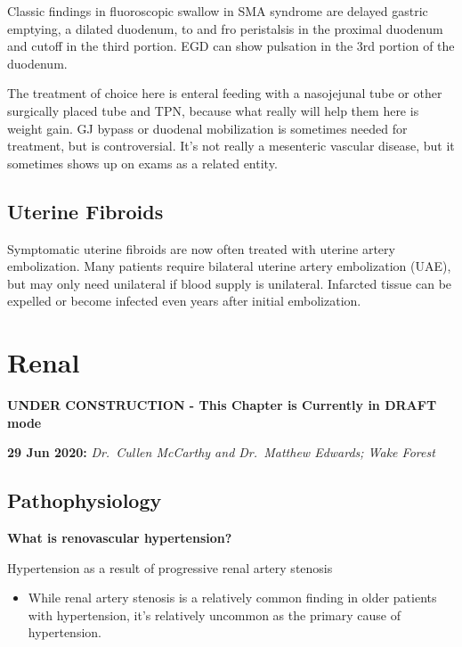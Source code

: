 \documentclass[
]{book}
\providecommand{\tightlist}{%
  \setlength{\itemsep}{0pt}\setlength{\parskip}{0pt}}
\begin{document}
Classic findings in fluoroscopic swallow in SMA syndrome are delayed
gastric emptying, a dilated duodenum, to and fro peristalsis in the
proximal duodenum and cutoff in the third portion. EGD can show
pulsation in the 3rd portion of the
duodenum.\citep{warnckeSuperiorMesentericArtery2019}

The treatment of choice here is enteral feeding with a nasojejunal tube
or other surgically placed tube and TPN, because what really will help
them here is weight gain. GJ bypass or duodenal mobilization is
sometimes needed for treatment, but is controversial. It's not really a
mesenteric vascular disease, but it sometimes shows up on exams as a
related entity.\citep{welschRecallingSuperiorMesenteric2007, merrettSuperiorMesentericArtery2009}

\hypertarget{uterine-fibroids}{%
\section{Uterine Fibroids}\label{uterine-fibroids}}

Symptomatic uterine fibroids are now often treated with uterine artery
embolization. Many patients require bilateral uterine artery
embolization (UAE), but may only need unilateral if blood supply is
unilateral. Infarcted tissue can be expelled or become infected even
years after initial embolization.
\citep{stepniakUterineArteryEmbolization2018}

\hypertarget{renal}{%
\chapter{Renal}\label{renal}}

\textbf{UNDER CONSTRUCTION - This Chapter is Currently in DRAFT mode}

\textbf{29 Jun 2020:} \emph{Dr.~Cullen McCarthy and Dr.~Matthew Edwards; Wake
Forest}

\hypertarget{pathophysiology-1}{%
\section{Pathophysiology}\label{pathophysiology-1}}

\textbf{What is renovascular hypertension?}

Hypertension as a result of progressive renal artery stenosis

\begin{itemize}
\tightlist
\item
  While renal artery stenosis is a relatively common finding in older
  patients with hypertension, it's relatively uncommon as the primary
  cause of hypertension.
\end{itemize}
\end{document}
